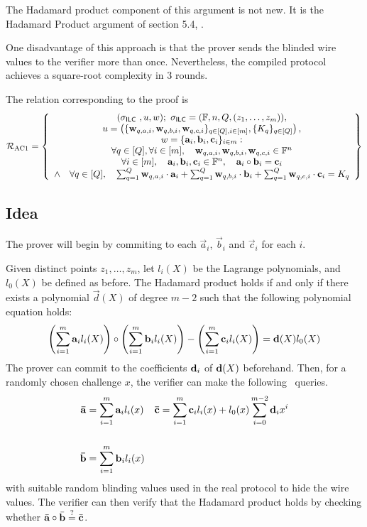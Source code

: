 The Hadamard product component of this argument is not new. It is the Hadamard Product argument of section 5.4, \cite{Bayer2014}.

One disadvantage of this approach is that the prover sends the blinded wire values to the verifier more than once. Nevertheless, the compiled protocol achieves a square-root complexity in 3 rounds.

The relation corresponding to the proof is
\[
\mathcal{R}_{\textnormal{AC1}}=\left\{\begin{array}{c}
(\mathsf{\sigma}_{\mathsf{ILC}~},u,w); \ \mathsf{\sigma}_{\mathsf{ILC}} = (\mathbb{F},n,Q,(z_1,\ldots,z_m)), \\
u = \left( \{\mathbf{w}_{q,{a,i}},\mathbf{w}_{q,{b,i}},\mathbf{w}_{q,{c,i}}\}_{q \in [Q], i \in [m]}, \{K_{q}\}_{q \in [Q]}\right), \\
w = \{\mathbf{a}_i,\mathbf{b}_i,\mathbf{c}_i\}_{i \in m}:\\
\forall q \in [Q], \forall i \in [m], \quad \mathbf{w}_{q,a,i}, \mathbf{w}_{q,b,i}, \mathbf{w}_{q,c,i} \in \mathbb{F}^n \\
\forall i \in [m], \quad \mathbf{a}_i,\mathbf{b}_i,\mathbf{c}_i \in \mathbb{F}^n, \quad \mathbf{a}_i \circ \mathbf{b}_i=\mathbf{c}_i \\
\wedge \quad \forall q \in [Q], \quad \sum_{q=1}^Q \mathbf{w}_{q,a,i} \cdot \mathbf{a}_i + \sum_{q=1}^Q \mathbf{w}_{q,b,i} \cdot \mathbf{b}_i + \sum_{q=1}^Q \mathbf{w}_{q,c,i} \cdot \mathbf{c}_i = K_q
\end{array}\right\}
\]

\subsection{Idea}

The prover will begin by commiting to each $\vec{a}_{i}$, $\vec{b}_i$ and $\vec{c}_i$ for each $i$.

Given distinct points $z_1,\ldots,z_m$, let $l_i(X)$ be the Lagrange polynomials, and $l_0(X)$ be defined as before. The Hadamard product holds if and only if there exists a polynomial $\vec{d}(X)$ of degree $m-2$ such that the following polynomial equation holds:
\begin{align*}
\left( \sum_{i=1}^m \mathbf{a}_i l_i(X) \right) \circ \left( \sum_{i=1}^m \mathbf{b}_i l_i(X) \right) - \left( \sum_{i=1}^m \mathbf{c}_{i} l_i(X) \right) = \mathbf{d}(X) l_0(X)
\end{align*}
 The prover can commit to the coefficients $\mathbf{d}_i$ of $\mathbf{d}(X)$ beforehand. Then, for a randomly chosen challenge $x$, the verifier can make the following \ILC\ queries.
\begin{align*}
\mathbf{\bar{a}} &= \sum_{i=1}^m \mathbf{a}_{i} l_i(x) && \mathbf{\bar{c}} = \sum_{i=1}^m \mathbf{c}_{i} l_i(x) + l_0(x) \sum_{i=0}^{m-2} \mathbf{d}_i x^i \\ \\
\mathbf{\bar{b}} &= \sum_{i=1}^m \mathbf{b}_{i} l_i(x) &
\end{align*}
with suitable random blinding values used in the real protocol to hide the wire values. The verifier can then verify that the Hadamard product holds by checking whether $\bar{\mathbf{a}} \circ \bar{\mathbf{b}} \overset{?}{=} \bar{\mathbf{c}}$.

